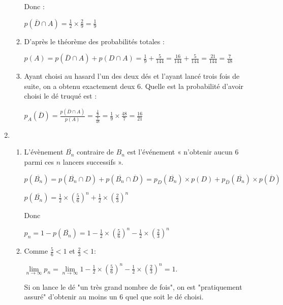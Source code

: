 \begin{corrige}
\begin{enumerate}
\begin{enumerate}[label=\alph*.]
               \par
               Donc :
               \par
               $p\left(\overline{D} \cap A\right)=\frac{1}{2}\times \frac{2}{9}=\frac{1}{9}$
\begin{center}
\end{center}
               \item
               D'après le théorème des probabilités totales :
               \par
               $p\left(A\right)=p\left(\overline{D} \cap A\right)+p\left(D \cap A\right)=\frac{1}{9}+\frac{5}{144}=\frac{16}{144}+\frac{5}{144}=\frac{21}{144}=\frac{7}{48}$
               \item
               Ayant choisi au hasard l'un des deux dés et l'ayant lancé trois fois de suite, on a obtenu exactement deux 6. Quelle est la probabilité d'avoir choisi le dé truqué est :
               \par
               $p_{A}\left(\overline{D}\right)=\frac{p\left(\overline{D} \cap A\right)}{p\left(A\right)}=\frac{\frac{1}{9}}{\frac{7}{48}}=\frac{1}{9}\times \frac{48}{7}=\frac{16}{21}$
          \end{enumerate}
          \item
          \begin{enumerate}[label=\alph*.]
               \item
               L'évènement $\overline{B_{n}}$ contraire de $B_{n}$ est l'événement « n'obtenir aucun 6 parmi ces $n$ lancers successifs ».
               \par
               $p\left(\overline{B_{n}}\right)=p\left(\overline{B_{n}} \cap D\right)+p\left(\overline{B_{n}} \cap \overline{D}\right)=p_{D}\left(\overline{B_{n}}\right)\times p\left(D\right)+p_{\overline{D}}\left(\overline{B_{n}}\right)\times p\left(\overline{D}\right)$
               \par
               $p\left(\overline{B_{n}}\right)=\frac{1}{2}\times \left(\frac{5}{6}\right)^{n}+\frac{1}{2}\times \left(\frac{2}{3}\right)^{n}$
               \par
               Donc
               \par
               $p_{n}=1-p\left(\overline{B_{n}}\right)=1-\frac{1}{2}\times \left(\frac{5}{6}\right)^{n}-\frac{1}{2}\times \left(\frac{2}{3}\right)^{n}$
               \item
               Comme $\frac{5}{6} < 1$ et $\frac{2}{3} < 1$:
               \par
               $\lim\limits_{n\rightarrow \infty } p_{n}=\lim\limits_{n\rightarrow \infty }1-\frac{1}{2}\times \left(\frac{5}{6}\right)^{n}-\frac{1}{2}\times \left(\frac{2}{3}\right)^{n}=1$.
               \par
               Si on lance le dé "un très grand nombre de fois", on est "pratiquement assuré" d'obtenir au moins un 6 quel que soit le dé choisi.
          \end{enumerate}
     \end{enumerate}
\end{corrige}
